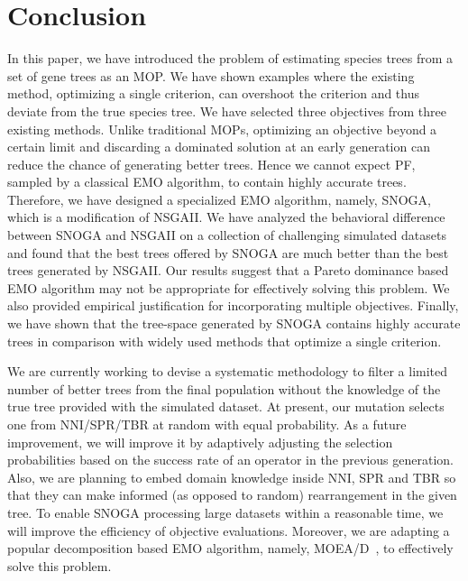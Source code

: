 \section{Conclusion} In this paper, we have introduced the problem of estimating species trees from a set of gene trees as an MOP. We have shown examples where the existing method, optimizing a single criterion, can overshoot the criterion and thus deviate from the true species tree. We have selected three objectives from three existing methods. Unlike traditional MOPs, optimizing an objective beyond a certain limit and discarding a dominated solution at an early generation can reduce the chance of generating better trees. Hence we cannot expect PF, sampled by a classical EMO algorithm, to contain highly accurate trees. Therefore, we have designed a specialized EMO algorithm, namely, SNOGA, which is a modification of NSGAII. We have analyzed the behavioral difference between SNOGA and NSGAII on a collection of challenging simulated datasets and found that the best trees offered by SNOGA are much better than the best trees generated by NSGAII. Our results suggest that a Pareto dominance based EMO algorithm may not be appropriate for effectively solving this problem. We also provided empirical justification for incorporating multiple objectives. Finally, we have shown that the tree-space generated by SNOGA contains highly accurate trees in comparison with widely used methods that optimize a single criterion. 



We are currently working to devise a systematic methodology to filter a limited number of better trees from the final population without the knowledge of the true tree provided with the simulated dataset. At present, our mutation selects one from NNI/SPR/TBR at random with equal probability. As a future improvement, we will improve it by adaptively adjusting the selection probabilities based on the success rate of an operator in the previous generation. Also, we are planning to embed domain knowledge inside NNI, SPR and TBR so that they can make informed (as opposed to random) rearrangement in the given tree. To enable SNOGA processing large datasets within a reasonable time, we will improve the efficiency of objective evaluations. Moreover, we are adapting a popular decomposition based EMO algorithm, namely, MOEA/D~\cite{zhang2007moea}, to effectively solve this problem. 



